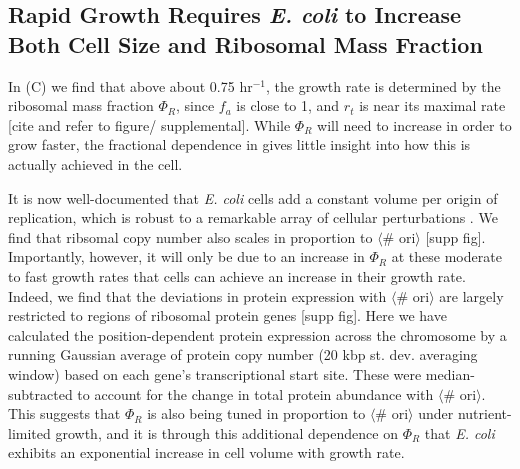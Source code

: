 \subsection{Rapid Growth Requires \textit{E. coli} to Increase Both Cell Size and Ribosomal
Mass Fraction}
In (C) we find that above about 0.75 hr$^{-1}$, the growth
rate is determined by the ribosomal mass fraction $\Phi_R$, since $f_a$ is close
to 1, and $r_t$ is near its maximal rate [cite and refer to figure/
supplemental]. While $\Phi_R$ will need to increase in order to grow faster, the
fractional dependence in  gives little insight
into how this is actually achieved in the cell.

It is now well-documented that \textit{E. coli} cells add a constant volume per
origin of replication, which is robust to a remarkable array of cellular
perturbations \citep{si2017}. We find that ribsomal copy number also scales in
proportion to $\langle$\# ori$\rangle$ [supp fig]. Importantly, however, it will
only be due to an increase in $\Phi_R$ at these moderate to fast growth rates
that cells can achieve an increase in their growth rate. Indeed, we find that
the deviations in protein expression with $\langle$\# ori$\rangle$ are largely
restricted to regions of ribosomal protein genes [supp fig]. Here we have calculated
the position-dependent protein expression across the chromosome by a running
Gaussian average of protein copy number (20 kbp st. dev. averaging window) based
on each gene's transcriptional start site. These were median-subtracted to
account for the change in total protein abundance with $\langle$\# ori$\rangle$.
This suggests that $\Phi_R$ is also being tuned in proportion to $\langle$\#
ori$\rangle$ under nutrient-limited growth, and it is through this additional
dependence on $\Phi_R$ that \textit{E. coli} exhibits an exponential increase in
cell volume with growth rate.




%
%
%
%
%



